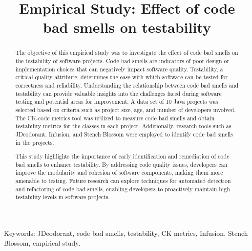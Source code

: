 \documentclass[conference]{IEEEtran}
\begin{document}
	
	\title{Empirical Study: Effect of code bad smells on testability}
	\author{
		\and
		}
	
	\maketitle
	
	\begin{abstract}
		The objective of this empirical study was to investigate the effect of code bad smells on the testability of software projects. Code bad smells are indicators of poor design or implementation choices that can negatively impact software quality. Testability, a critical quality attribute, determines the ease with which software can be tested for correctness and reliability. Understanding the relationship between code bad smells and testability can provide valuable insights into the challenges faced during software testing and potential areas for improvement. A data set of 10 Java projects was selected based on criteria such as project size, age, and number of developers involved. The CK-code metrics tool was utilized to measure code bad smells and obtain testability metrics for the classes in each project. Additionally, research tools such as JDeodorant, Infusion, and Stench Blossom were employed to identify code bad smells in the projects.
		
		This study highlights the importance of early identification and remediation of code bad smells to enhance testability. By addressing code quality issues, developers can improve the modularity and cohesion of software components, making them more amenable to testing. Future research can explore techniques for automated detection and refactoring of code bad smells, enabling developers to proactively maintain high testability levels in software projects.
	\end{abstract}
	
	\begin{IEEEkeywords}
		Keywords: JDeodorant, code bad smells, testability, CK metrics, Infusion, Stench Blossom, empirical study.
	\end{IEEEkeywords}
	
\end{document}
